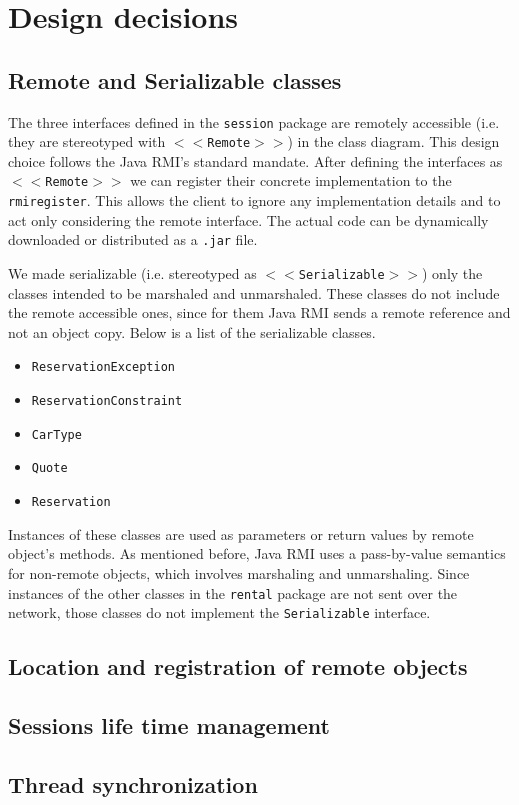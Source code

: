 \section{Design decisions}
\subsection{Remote and Serializable classes}
The three interfaces defined in the \texttt{session} package are remotely accessible (i.e. they are stereotyped with \texttt{$<<$Remote$>>$}) in the class diagram. This design choice follows the Java RMI's standard mandate. After defining the interfaces as \texttt{$<<$Remote$>>$} we can register their concrete implementation to the \texttt{rmiregister}. This allows the client to ignore any implementation details and to act only considering the remote interface. The actual code can be dynamically downloaded or distributed as a \texttt{.jar} file.

We made serializable (i.e. stereotyped as \texttt{$<<$Serializable$>>$}) only the classes intended to be marshaled and unmarshaled. These classes do not include the remote accessible ones, since for them Java RMI sends a remote reference and not an object copy. Below is a list of the serializable classes.
\begin{itemize}
	\item \texttt{ReservationException}
	\item \texttt{ReservationConstraint}
	\item \texttt{CarType}
	\item \texttt{Quote}
	\item \texttt{Reservation}
\end{itemize}
Instances of these classes are used as parameters or return values by remote object's methods. As mentioned before, Java RMI uses a pass-by-value semantics for non-remote objects, which involves marshaling and unmarshaling. Since instances of the other classes in the \texttt{rental} package are not sent over the network, those classes do not implement the \texttt{Serializable} interface. 

\subsection{Location and registration of remote objects}

\subsection{Sessions life time management}

\subsection{Thread synchronization}
